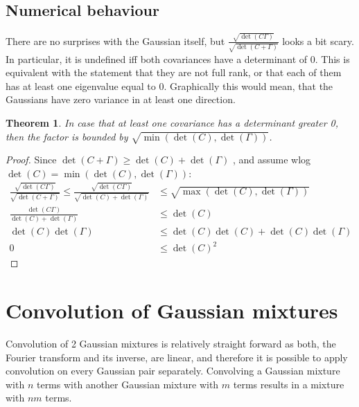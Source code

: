 \documentclass{paper}
\newtheorem{theorem}{Theorem}
\newcommand{\f}[1]{\operatorname{#1}}
\begin{document}
\subsection{Numerical behaviour}
There are no surprises with the Gaussian itself, but $\frac{\sqrt{\f{det}(C\Gamma)}}{\sqrt{\f{det}(C+\Gamma)}}$ looks a bit scary.
In particular, it is undefined iff both covariances have a determinant of 0.
This is equivalent with the statement that they are not full rank, or that each of them has at least one eigenvalue equal to 0.
Graphically this would mean, that the Gaussians have zero variance in at least one direction.

\begin{theorem}
	In case that at least one covariance has a determinant greater 0, then the factor is bounded by $\sqrt{\f{min}(\f{det}(C), \f{det}(\Gamma))}$.
\end{theorem}
\begin{proof}
Since $\f{det}(C+\Gamma) \ge \f{det}(C) + \f{det}(\Gamma)$ \cite{wiki_det_inequalities}, and assume wlog $\f{det}(C) = \f{min}(\f{det}(C), \f{det}(\Gamma))$:
\begin{align*}
	\frac{\sqrt{\f{det}(C\Gamma)}}{\sqrt{\f{det}(C+\Gamma)}} \le \frac{\sqrt{\f{det}(C\Gamma)}}{\sqrt{\f{det}(C) + \f{det}(\Gamma)}} &\le \sqrt{\f{max}(\f{det}(C), \f{det}(\Gamma))} \\
	\frac{\f{det}(C\Gamma)}{\f{det}(C) + \f{det}(\Gamma)} &\le \f{det}(C) \\
	\f{det}(C)\f{det}(\Gamma) &\le \f{det}(C)\f{det}(C) + \f{det}(C)\f{det}(\Gamma) \\
	0 &\le \f{det}(C)^2
\end{align*}
\end{proof}

\section{Convolution of Gaussian mixtures}
Convolution of 2 Gaussian mixtures is relatively straight forward as both, the Fourier transform and its inverse, are linear, and therefore it is possible to apply convolution on every Gaussian pair separately.
Convolving a Gaussian mixture with $n$ terms with another Gaussian mixture with $m$ terms results in a mixture with $nm$ terms.
\end{document}
